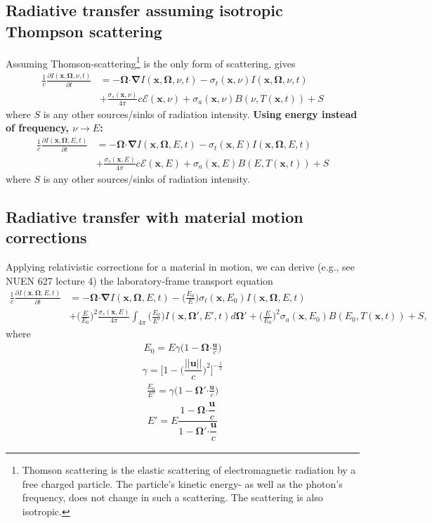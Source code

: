 \documentclass[10pt,letterpaper,notitlepage]{article}
\numberwithin{equation}{section}
\newcommand{\Omegabf}{\mathbf{\Omega}}
\newcommand{\bnabla}{\boldsymbol{\nabla}}
\newcommand{\position}{\mathbf{x}}
\newcommand{\dotp}{\boldsymbol{\cdot}}
\newcommand{\RadE}{\mathcal{E}}
\newcommand{\beqn}{\begin{equation}\begin{aligned}}
\newcommand{\eeqn}{\end{aligned}\end{equation}}
\begin{document}
\subsection{Radiative transfer assuming isotropic Thompson scattering}
Assuming Thomson-scattering\footnote{Thomson scattering is the elastic scattering of electromagnetic radiation by a free charged particle. The particle's kinetic energy- as well as the photon's frequency, does not change in such a scattering. The scattering is also isotropic.} is the only form of scattering, gives
\beqn 
\frac{1}{c} \frac{\partial I(\position, \Omegabf, \nu, t)}{\partial t} &=
-\Omegabf \dotp \bnabla I(\position, \Omegabf, \nu, t)
- \sigma_t(\position,\nu) I(\position, \Omegabf, \nu, t) \\
&+ \frac{\sigma_s(\position,\nu)}{4\pi} c \RadE(\position, \nu)
+ \sigma_a(\position,\nu) B(\nu,T(\position, t))+S
\eeqn 
where $S$ is any other sources/sinks of radiation intensity. 
\newline
\newline
\textbf{Using energy instead of frequency, $\nu\to E$:}
\beqn 
\frac{1}{c} \frac{\partial I(\position, \Omegabf, E, t)}{\partial t} &=
-\Omegabf \dotp \bnabla I(\position, \Omegabf, E, t)
- \sigma_t(\position,E) I(\position, \Omegabf, E, t) \\
&+ \frac{\sigma_s(\position,E)}{4\pi} c \RadE(\position, E)
+ \sigma_a(\position,E) B(E,T(\position, t))+S
\eeqn 
where $S$ is any other sources/sinks of radiation intensity. 

\subsection{Radiative transfer with material motion corrections}
Applying relativistic corrections for a material in motion, we can derive (e.g., see NUEN 627 lecture 4) the laboratory-frame transport equation
\beqn 
\frac{1}{c} \frac{\partial I(\position, \Omegabf, E, t)}{\partial t} &=
-\Omegabf \dotp \bnabla I(\position, \Omegabf, E, t)
- \biggr(\frac{E_0}{E}\biggr)\sigma_t(\position,E_0) I(\position, \Omegabf, E, t) \\
&+ \biggr(\frac{E}{E_0}\biggr)^2\frac{\sigma_s(\position,E)}{4\pi} \int_{4\pi} \biggr(\frac{E_0}{E'}\biggr) I(\position, \Omegabf', E', t) d\Omegabf'
+ \biggr(\frac{E}{E_0}\biggr)^2 \sigma_a(\position,E_0) B(E_0,T(\position, t))+S,
\eeqn 
where
\beqn 
E_0 = E \gamma \biggr(1-\Omegabf \dotp \frac{\mathbf{u}}{c}\biggr)
\eeqn 
\beqn 
\gamma = \biggr[ 1-\biggr(\dfrac{||\mathbf{u}||}{c}\biggr)^2 \biggr]^{-\frac{1}{2}}
\eeqn 
\beqn 
\frac{E_0}{E'} = \gamma \biggr(1-\Omegabf' \dotp \frac{\mathbf{u}}{c} \biggr)
\eeqn 
\beqn 
E' = E \dfrac{1-\Omegabf \dotp \dfrac{\mathbf{u}}{c}}{1-\Omegabf' \dotp \dfrac{\mathbf{u}}{c}}
\eeqn 
\end{document}
